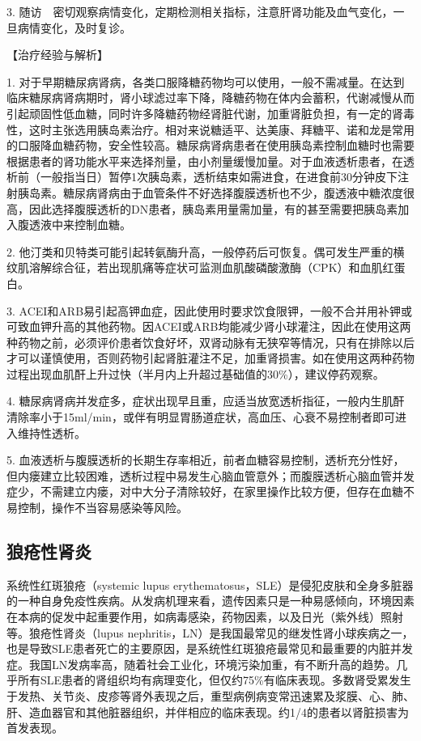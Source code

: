 3.
随访　密切观察病情变化，定期检测相关指标，注意肝肾功能及血气变化，一旦病情变化，及时复诊。

【治疗经验与解析】

1.
对于早期糖尿病肾病，各类口服降糖药物均可以使用，一般不需减量。在达到临床糖尿病肾病期时，肾小球滤过率下降，降糖药物在体内会蓄积，代谢减慢从而引起顽固性低血糖，同时许多降糖药物经肾脏代谢，加重肾脏负担，有一定的肾毒性，这时主张选用胰岛素治疗。相对来说糖适平、达美康、拜糖平、诺和龙是常用的口服降血糖药物，安全性较高。糖尿病肾病患者在使用胰岛素控制血糖时也需要根据患者的肾功能水平来选择剂量，由小剂量缓慢加量。对于血液透析患者，在透析前（一般指当日）暂停1次胰岛素，透析结束如需进食，在进食前30分钟皮下注射胰岛素。糖尿病肾病由于血管条件不好选择腹膜透析也不少，腹透液中糖浓度很高，因此选择腹膜透析的DN患者，胰岛素用量需加量，有的甚至需要把胰岛素加入腹透液中来控制血糖。

2.
他汀类和贝特类可能引起转氨酶升高，一般停药后可恢复。偶可发生严重的横纹肌溶解综合征，若出现肌痛等症状可监测血肌酸磷酸激酶（CPK）和血肌红蛋白。

3.
ACEI和ARB易引起高钾血症，因此使用时要求饮食限钾，一般不合并用补钾或可致血钾升高的其他药物。因ACEI或ARB均能减少肾小球灌注，因此在使用这两种药物之前，必须评价患者饮食好坏，双肾动脉有无狭窄等情况，只有在排除以后才可以谨慎使用，否则药物引起肾脏灌注不足，加重肾损害。如在使用这两种药物过程出现血肌酐上升过快（半月内上升超过基础值的30\%），建议停药观察。

4.
糖尿病肾病并发症多，症状出现早且重，应适当放宽透析指征，一般内生肌酐清除率小于15ml/min，或伴有明显胃肠道症状，高血压、心衰不易控制者即可进入维持性透析。

5.
血液透析与腹膜透析的长期生存率相近，前者血糖容易控制，透析充分性好，但内瘘建立比较困难，透析过程中易发生心脑血管意外；而腹膜透析心脑血管并发症少，不需建立内瘘，对中大分子清除较好，在家里操作比较方便，但存在血糖不易控制，操作不当容易感染等风险。

\subsection{狼疮性肾炎}

系统性红斑狼疮（systemic lupus
erythematosus，SLE）是侵犯皮肤和全身多脏器的一种自身免疫性疾病。从发病机理来看，遗传因素只是一种易感倾向，环境因素在本病的促发中起重要作用，如病毒感染，药物因素，以及日光（紫外线）照射等。狼疮性肾炎（lupus
nephritis，LN）是我国最常见的继发性肾小球疾病之一，也是导致SLE患者死亡的主要原因，是系统性红斑狼疮最常见和最重要的内脏并发症。我国LN发病率高，随着社会工业化，环境污染加重，有不断升高的趋势。几乎所有SLE患者的肾组织均有病理变化，但仅约75\%有临床表现。多数肾受累发生于发热、关节炎、皮疹等肾外表现之后，重型病例病变常迅速累及浆膜、心、肺、肝、造血器官和其他脏器组织，并伴相应的临床表现。约1/4的患者以肾脏损害为首发表现。

